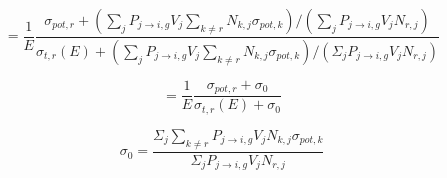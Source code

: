 \documentclass[10pt]{article}
\begin{document}
\begin{equation}=\frac{1}{E}\frac{\sigma_{pot,r}+\left(\sum\limits_j P_{j\rightarrow i,g}V_{j}\sum\limits_{k\neq r}N_{k,j}\sigma_{pot,k}\right)/\left(\sum\limits_jP_{j\rightarrow i,g}V_{j}N_{r,j}\right)}{\sigma_{t,r}(E)+\left(\sum\limits_j P_{j\rightarrow i,g}V_{j}\sum\limits_{k\neq r}N_{k,j}\sigma_{pot,k}\right)/\left(\Sigma_jP_{j\rightarrow i,g}V_{j}N_{r,j}\right)}\end{equation}

\begin{equation}=\frac{1}{E}\frac{\sigma_{pot,r}+\sigma_{0}}{\sigma_{t,r}(E)+\sigma_{0}}\end{equation}


\begin{equation}\sigma_{0}=\frac{\Sigma_j\sum\limits_{k\neq r}P_{j\rightarrow i,g}V_{j}N_{k,j}\sigma_{pot,k}}{\Sigma_jP_{j\rightarrow i,g}V_{j}N_{r,j}}\end{equation}




\end{document}
